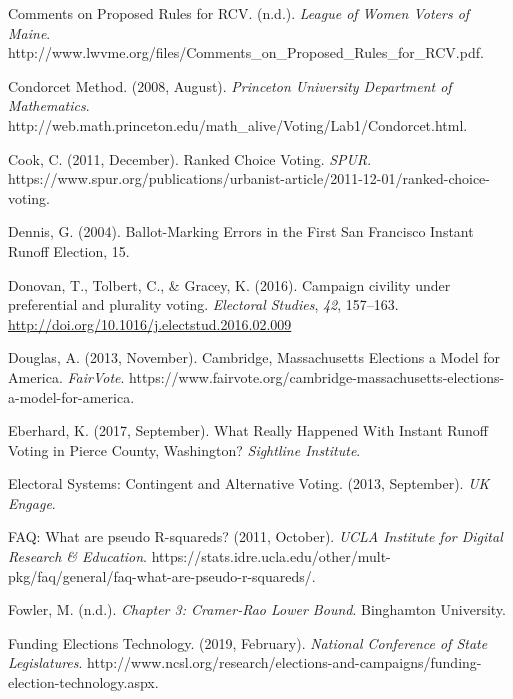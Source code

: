 \documentclass[12pt,twoside]{reedthesis}
\begin{document}
\leavevmode\hypertarget{ref-noauthor_comments_nodate}{}%
Comments on Proposed Rules for RCV. (n.d.). \emph{League of Women Voters of Maine}. http://www.lwvme.org/files/Comments\_on\_Proposed\_Rules\_for\_RCV.pdf.

\leavevmode\hypertarget{ref-noauthor_condorcet_2008}{}%
Condorcet Method. (2008, August). \emph{Princeton University Department of Mathematics}. http://web.math.princeton.edu/math\_alive/Voting/Lab1/Condorcet.html.

\leavevmode\hypertarget{ref-cook_ranked_2011}{}%
Cook, C. (2011, December). Ranked Choice Voting. \emph{SPUR}. https://www.spur.org/publications/urbanist-article/2011-12-01/ranked-choice-voting.

\leavevmode\hypertarget{ref-dennis_ballot-marking_2004}{}%
Dennis, G. (2004). Ballot-Marking Errors in the First San Francisco Instant Runoff Election, 15.

\leavevmode\hypertarget{ref-donovan_campaign_2016}{}%
Donovan, T., Tolbert, C., \& Gracey, K. (2016). Campaign civility under preferential and plurality voting. \emph{Electoral Studies}, \emph{42}, 157--163. \url{http://doi.org/10.1016/j.electstud.2016.02.009}

\leavevmode\hypertarget{ref-douglas_cambridge_2013}{}%
Douglas, A. (2013, November). Cambridge, Massachusetts Elections a Model for America. \emph{FairVote}. https://www.fairvote.org/cambridge-massachusetts-elections-a-model-for-america.

\leavevmode\hypertarget{ref-eberhard_what_2017}{}%
Eberhard, K. (2017, September). What Really Happened With Instant Runoff Voting in Pierce County, Washington? \emph{Sightline Institute}.

\leavevmode\hypertarget{ref-noauthor_electoral_2013}{}%
Electoral Systems: Contingent and Alternative Voting. (2013, September). \emph{UK Engage}.

\leavevmode\hypertarget{ref-noauthor_faq_2011}{}%
FAQ: What are pseudo R-squareds? (2011, October). \emph{UCLA Institute for Digital Research \& Education}. https://stats.idre.ucla.edu/other/mult-pkg/faq/general/faq-what-are-pseudo-r-squareds/.

\leavevmode\hypertarget{ref-fowler_chapter_2018}{}%
Fowler, M. (n.d.). \emph{Chapter 3: Cramer-Rao Lower Bound}. Binghamton University.

\leavevmode\hypertarget{ref-noauthor_funding_2019}{}%
Funding Elections Technology. (2019, February). \emph{National Conference of State Legislatures}. http://www.ncsl.org/research/elections-and-campaigns/funding-election-technology.aspx.
\end{document}
